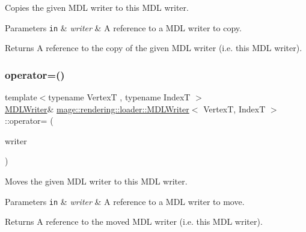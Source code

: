Copies the given M\+DL writer to this M\+DL writer.


\begin{DoxyParams}[1]{Parameters}
\mbox{\tt in}  & {\em writer} & A reference to a M\+DL writer to copy. \\
\hline
\end{DoxyParams}
\begin{DoxyReturn}{Returns}
A reference to the copy of the given M\+DL writer (i.\+e. this M\+DL writer). 
\end{DoxyReturn}
\mbox{\label{classmage_1_1rendering_1_1loader_1_1_m_d_l_writer_aaa2a3f4e8025bffefefaae7d3ef018f0}} 
\subsubsection{\texorpdfstring{operator=()}{operator=()}\hspace{0.1cm}{\footnotesize\ttfamily [2/2]}}
{\footnotesize\ttfamily template$<$typename VertexT , typename IndexT $>$ \\
\mbox{\hyperlink{classmage_1_1rendering_1_1loader_1_1_m_d_l_writer}{M\+D\+L\+Writer}}\& \mbox{\hyperlink{classmage_1_1rendering_1_1loader_1_1_m_d_l_writer}{mage\+::rendering\+::loader\+::\+M\+D\+L\+Writer}}$<$ VertexT, IndexT $>$\+::operator= (\begin{DoxyParamCaption}\item[{\mbox{\hyperlink{classmage_1_1rendering_1_1loader_1_1_m_d_l_writer}{M\+D\+L\+Writer}}$<$ VertexT, IndexT $>$ \&\&}]{writer }\end{DoxyParamCaption})\hspace{0.3cm}{\ttfamily [delete]}}

Moves the given M\+DL writer to this M\+DL writer.


\begin{DoxyParams}[1]{Parameters}
\mbox{\tt in}  & {\em writer} & A reference to a M\+DL writer to move. \\
\hline
\end{DoxyParams}
\begin{DoxyReturn}{Returns}
A reference to the moved M\+DL writer (i.\+e. this M\+DL writer). 
\end{DoxyReturn}
\mbox{\label{classmage_1_1rendering_1_1loader_1_1_m_d_l_writer_a1506b1a09c7a7c1ee1e206cc6d5cd0e0}} 
